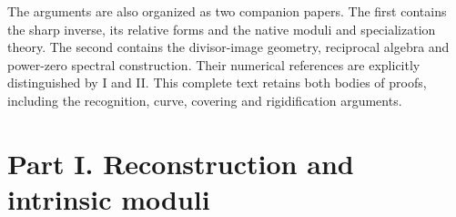 The arguments are also organized as two companion papers.  The first
contains the sharp inverse, its relative forms and the native moduli
and specialization theory.  The second contains the divisor-image
geometry, reciprocal algebra and power-zero spectral construction.
Their numerical references are explicitly distinguished by I and II.
This complete text retains both bodies of proofs, including the
recognition, curve, covering and rigidification arguments.

\part*{Part I. Reconstruction and intrinsic moduli}
